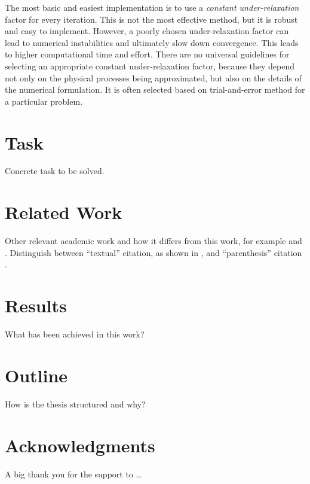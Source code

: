 The most basic and easiest implementation is to use a \textit{constant under-relaxation} factor for every iteration. This is not the most effective method, but it is robust and easy to implement. However, a poorly chosen under-relaxation factor can lead to numerical instabilities and ultimately slow down convergence. This leads to higher computational time and effort. There are no universal guidelines for selecting an appropriate constant under-relaxation factor, because they depend not only on the physical processes being approximated, but also on the details of the numerical formulation. It is often selected based on trial-and-error method for a particular problem. 

\section{Task}

Concrete task to be solved. 



\section{Related Work}

Other relevant academic work and how it differs from this work, for
example \citet{shannon_diff} and \citet{blowfish}. Distinguish between
``textual'' citation, as shown in \citet{shannon_diff}, and
``parenthesis'' citation \citep{blowfish}.



\section{Results}

What has been achieved in this work? 


\section{Outline}

How is the thesis structured and why? 


\section{Acknowledgments}

A big thank you for the support to \ldots 

